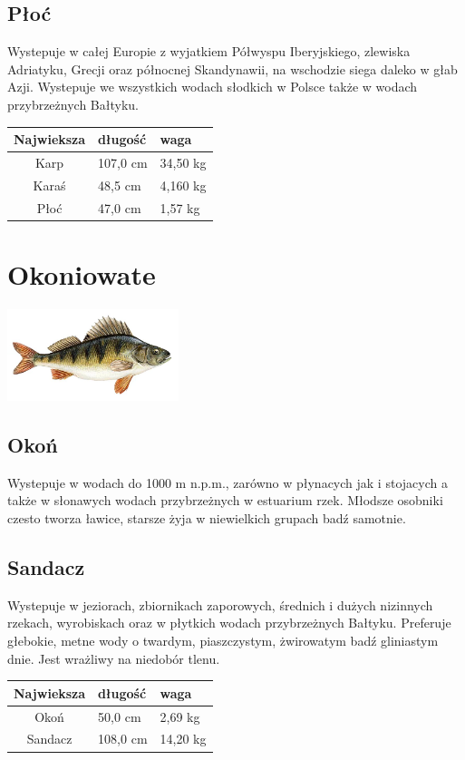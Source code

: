 \documentclass[12pt,a4paper,titlepage]{book}
\begin{document}
\section{Płoć}
Wystepuje w całej Europie z wyjatkiem Półwyspu Iberyjskiego, zlewiska Adriatyku, Grecji oraz północnej Skandynawii, na wschodzie siega daleko w głab Azji. Wystepuje we wszystkich wodach słodkich w Polsce także w wodach przybrzeżnych Bałtyku.
\begin{table}
\begin{center}
\begin{tabular}{|c||l|l|}
\hline Najwieksza & długość & waga \\ \hline \hline
Karp & 107,0 cm & 34,50 kg  \\
Karaś & 48,5 cm & 4,160 kg  \\
Płoć & 47,0 cm & 1,57 kg  \\ \hline
\end{tabular}
\end{center}
\end{table}
\chapter{Okoniowate}
\includegraphics[width=50mm,height=!]{okon}
\section{Okoń}
Wystepuje w wodach do 1000 m n.p.m., zarówno w płynacych jak i stojacych a także w słonawych wodach przybrzeżnych w estuarium rzek. Młodsze osobniki czesto tworza ławice, starsze żyja w niewielkich grupach badź samotnie.
\section{Sandacz}
Wystepuje w jeziorach, zbiornikach zaporowych, średnich i dużych nizinnych rzekach, wyrobiskach oraz w płytkich wodach przybrzeżnych Bałtyku. Preferuje głebokie, metne wody o twardym, piaszczystym, żwirowatym badź gliniastym dnie. Jest wrażliwy na niedobór tlenu.
\begin{table}
\begin{center}
\begin{tabular}{|c||l|l|}
\hline Najwieksza & długość & waga \\ \hline \hline
Okoń & 50,0 cm & 2,69 kg  \\
Sandacz & 108,0 cm & 14,20 kg  \\ \hline
\end{tabular}
\end{center}
\end{table}
\end{document}
